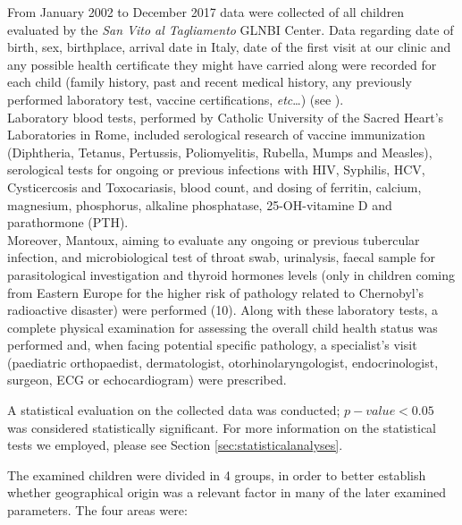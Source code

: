 From  January 2002 to  December 2017 data were collected of all children evaluated by the \textit{San Vito al Tagliamento} GLNBI Center. Data regarding date of birth, sex, birthplace, arrival date in Italy, date of the first visit at our clinic and any possible health certificate they might have carried along were recorded for each child (family history, past and recent medical history, any previously performed laboratory test, vaccine certifications, \textit{etc}\dots) (see \cite{redbook}).\\
Laboratory blood tests, performed by Catholic University of the Sacred Heart’s Laboratories in Rome, included serological research of vaccine immunization (Diphtheria, Tetanus, Pertussis, Poliomyelitis, Rubella, Mumps and Measles), serological tests for ongoing or previous infections with HIV, Syphilis, HCV, Cysticercosis and Toxocariasis, blood count, and dosing of ferritin, calcium, magnesium, phosphorus, alkaline phosphatase, 25-OH-vitamine D and parathormone (PTH).\\
Moreover, Mantoux, aiming to evaluate any ongoing or previous tubercular infection, and microbiological test of throat swab, urinalysis, faecal sample for parasitological investigation and thyroid hormones levels (only in children coming from Eastern Europe for the higher risk of pathology related to Chernobyl’s radioactive disaster) were performed (10).
Along with these laboratory tests, a complete physical examination for assessing the overall child health status was performed and, when facing potential specific pathology, a specialist’s visit (paediatric orthopaedist, dermatologist, otorhinolaryngologist, endocrinologist, surgeon, ECG or echocardiogram) were prescribed.

A statistical evaluation on the collected data was conducted; $p-value < 0.05$ was considered statistically significant. For more information on the statistical tests we employed, please see Section \ref{sec:statisticalanalyses}.


The examined children were divided in 4 groups, in order to better establish whether geographical origin was a relevant factor in many of the later examined parameters. The four areas were:

